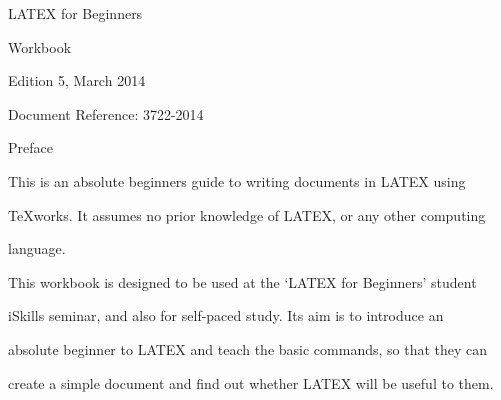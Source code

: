 \documentclass[a4paper,portrait,12pt]{article}
\begin{document}
\begin{flushleft}
LATEX for Beginners
\end{flushleft}


\begin{flushleft}
Workbook
\end{flushleft}


\begin{flushleft}
Edition 5, March 2014
\end{flushleft}


\begin{flushleft}
Document Reference: 3722-2014
\end{flushleft}





\begin{flushleft}
\newpage
\newpage
Preface
\end{flushleft}


\begin{flushleft}
This is an absolute beginners guide to writing documents in LATEX using
\end{flushleft}


\begin{flushleft}
TeXworks. It assumes no prior knowledge of LATEX, or any other computing
\end{flushleft}


\begin{flushleft}
language.
\end{flushleft}


\begin{flushleft}
This workbook is designed to be used at the {`}LATEX for Beginners' student
\end{flushleft}


\begin{flushleft}
iSkills seminar, and also for self-paced study. Its aim is to introduce an
\end{flushleft}


\begin{flushleft}
absolute beginner to LATEX and teach the basic commands, so that they can
\end{flushleft}


\begin{flushleft}
create a simple document and find out whether LATEX will be useful to them.
\end{flushleft}
\end{document}
